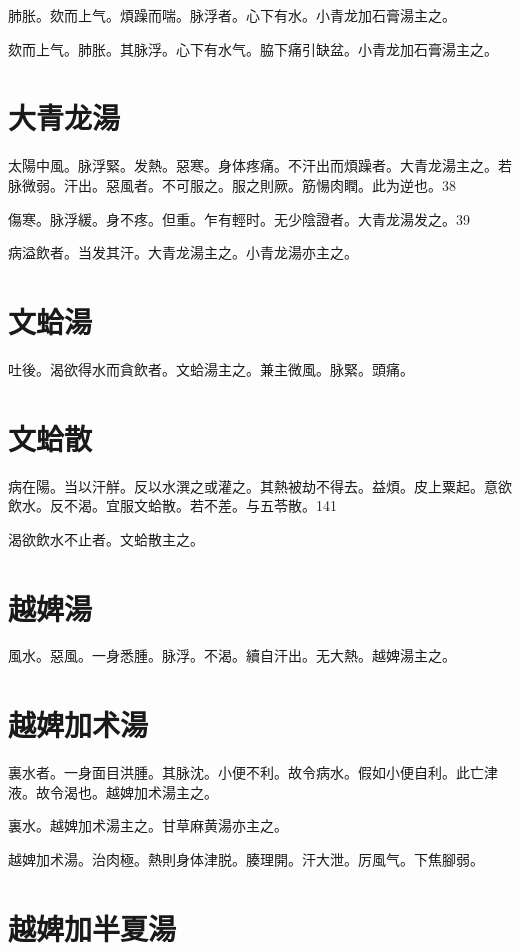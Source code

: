 \documentclass[12pt,twoside,UTF8,b5paper]{ctexbook}
\begin{document}
肺胀。欬而上气。煩躁而喘。脉浮者。心下有水。小青龙加石膏湯主之。

欬而上气。肺胀。其脉浮。心下有水气。脇下痛引缺盆。小青龙加石膏湯主之。

\section{大青龙湯}

太陽中風。脉浮緊。发熱。惡寒。身体疼痛。不汗出而煩躁者。大青龙湯主之。若脉微弱。汗出。惡風者。不可服之。服之則厥。筋愓肉瞤。此为逆也。38

傷寒。脉浮緩。身不疼。但重。乍有輕时。无少陰證者。大青龙湯发之。39

病溢飲者。当发其汗。大青龙湯主之。小青龙湯亦主之。

\section{文蛤湯}

吐後。渴欲得水而貪飲者。文蛤湯主之。兼主微風。脉緊。頭痛。

\section{文蛤散}

病在陽。当以汗觧。反以水潠之或灌之。其熱被劫不得去。益煩。皮上粟起。意欲飲水。反不渴。宜服文蛤散。若不差。与五苓散。141

渴欲飲水不止者。文蛤散主之。

\section{越婢湯}

風水。惡風。一身悉腫。脉浮。不渴。續自汗出。无大熱。越婢湯主之。

\section{越婢加术湯}

裏水者。一身面目洪腫。其脉沈。小便不利。故令病水。假如小便自利。此亡津液。故令渴也。越婢加术湯主之。

裏水。越婢加术湯主之。甘草麻黄湯亦主之。

越婢加术湯。治肉極。熱則身体津脱。腠理開。汗大泄。厉風气。下焦腳弱。

\section{越婢加半夏湯}
\end{document}
